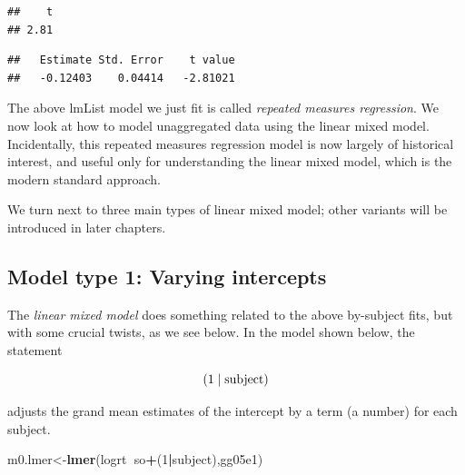 \documentclass[12pt,]{krantz}
\newenvironment{Shaded}{\begin{snugshade}}{\end{snugshade}}
\newcommand{\CommentTok}[1]{\textcolor[rgb]{0.56,0.35,0.01}{\textit{#1}}}
\newcommand{\DecValTok}[1]{\textcolor[rgb]{0.00,0.00,0.81}{#1}}
\newcommand{\KeywordTok}[1]{\textcolor[rgb]{0.13,0.29,0.53}{\textbf{#1}}}
\newcommand{\NormalTok}[1]{#1}
\newcommand{\OperatorTok}[1]{\textcolor[rgb]{0.81,0.36,0.00}{\textbf{#1}}}
\begin{document}
\begin{verbatim}
##    t 
## 2.81
\end{verbatim}

\begin{Shaded}
\end{Shaded}

\begin{verbatim}
##   Estimate Std. Error    t value 
##   -0.12403    0.04414   -2.81021
\end{verbatim}

The above lmList model we just fit is called \emph{repeated measures regression}. We now look at how to model unaggregated data using the linear mixed model. Incidentally, this repeated measures regression model is now largely of historical interest, and useful only for understanding the linear mixed model, which is the modern standard approach.

We turn next to three main types of linear mixed model; other variants will be introduced in later chapters.

\hypertarget{model-type-1-varying-intercepts}{%
\subsection{Model type 1: Varying intercepts}\label{model-type-1-varying-intercepts}}

The \emph{linear mixed model} does something related to the above by-subject fits, but with some crucial twists, as we see below.
In the model shown below, the statement

\begin{equation}
(1 \mid \hbox{subject}) 
\end{equation}

adjusts the grand mean estimates of the intercept by a term (a number) for each subject.

\begin{Shaded}
\begin{Highlighting}[]
\NormalTok{m0.lmer<-}\KeywordTok{lmer}\NormalTok{(logrt}\OperatorTok{~}\NormalTok{so}\OperatorTok{+}\NormalTok{(}\DecValTok{1}\OperatorTok{|}\NormalTok{subject),gg05e1)}
\end{Highlighting}
\end{Shaded}
\end{document}
